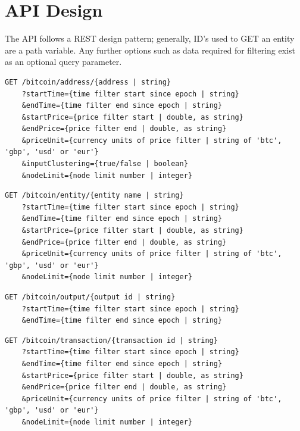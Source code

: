 \section{API Design}
The API follows a REST design pattern; generally, ID's used to GET an entity are a path variable. Any further options such as data required for filtering exist as an optional query parameter.  

\begin{lstlisting}[label={lst:address-api}, caption={Get an address using the unique full address. Several optional query parameters for filtering by time, price and enabling clustering and node limiting. \\[0.5cm] }, breaklines=true, basicstyle=\small]
GET /bitcoin/address/{address | string}
    ?startTime={time filter start since epoch | string}
    &endTime={time filter end since epoch | string}
    &startPrice={price filter start | double, as string}
    &endPrice={price filter end | double, as string}
    &priceUnit={currency units of price filter | string of 'btc', 'gbp', 'usd' or 'eur'}
    &inputClustering={true/false | boolean}
    &nodeLimit={node limit number | integer}
\end{lstlisting}

\begin{lstlisting}[caption={Get an entity using the unique name of the entity . All query parameters are optional for filtering.}, breaklines=true, basicstyle=\small]
GET /bitcoin/entity/{entity name | string}
    ?startTime={time filter start since epoch | string}
    &endTime={time filter end since epoch | string}
    &startPrice={price filter start | double, as string}
    &endPrice={price filter end | double, as string}
    &priceUnit={currency units of price filter | string of 'btc', 'gbp', 'usd' or 'eur'}
    &nodeLimit={node limit number | integer}
\end{lstlisting}

\begin{lstlisting}[caption={Get an output with a unique output ID. All query parameters are optional for filtering.}, breaklines=true, basicstyle=\small]
GET /bitcoin/output/{output id | string}
    ?startTime={time filter start since epoch | string}
    &endTime={time filter end since epoch | string}
\end{lstlisting}

\begin{lstlisting}[caption={Get a transaction with a unique transaction ID (txid). All query parameters are optional for filtering.}, breaklines=true, basicstyle=\small]
GET /bitcoin/transaction/{transaction id | string}
    ?startTime={time filter start since epoch | string}
    &endTime={time filter end since epoch | string}
    &startPrice={price filter start | double, as string}
    &endPrice={price filter end | double, as string}
    &priceUnit={currency units of price filter | string of 'btc', 'gbp', 'usd' or 'eur'}
    &nodeLimit={node limit number | integer}
\end{lstlisting}

